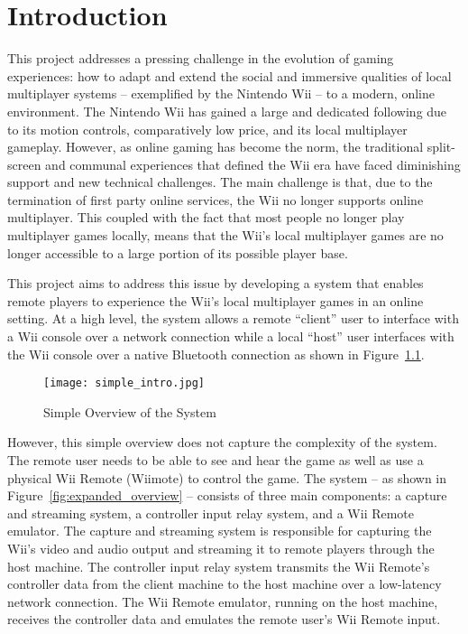 \chapter{Introduction}
\label{chapter:introduction}

This project addresses a pressing challenge in the evolution of gaming experiences: how to adapt and extend the social and immersive qualities of local multiplayer systems -- exemplified by the Nintendo Wii -- to a modern, online environment. The Nintendo Wii has gained a large and dedicated following due to its motion controls, comparatively low price, and its local multiplayer gameplay. However, as online gaming has become the norm\cite{businesswireOnlineGaming}, the traditional split-screen and communal experiences that defined the Wii era have faced diminishing support and new technical challenges. The main challenge is that, due to the termination of first party online services\cite{nintendoTerminationNintendo}, the Wii no longer supports online multiplayer. This coupled with the fact that most people no longer play multiplayer games locally\cite{academyofanimatedartOnlineGaming}, means that the Wii’s local multiplayer games are no longer accessible to a large portion of its possible player base.

This project aims to address this issue by developing a system that enables remote players to experience the Wii’s local multiplayer games in an online setting. At a high level, the system allows a remote ``client'' user to interface with a Wii console over a network connection while a local ``host'' user interfaces with the Wii console over a native Bluetooth connection as shown in Figure~\ref{fig:simple_overview}.

\begin{figure}[h]
	\centering
	\texttt{[image: simple\_intro.jpg]}
	\caption{Simple Overview of the System}
	\label{fig:simple_overview}
\end{figure}

However, this simple overview does not capture the complexity of the system. The remote user needs to be able to see and hear the game as well as use a physical Wii Remote (Wiimote) to control the game. The system -- as shown in Figure~\ref{fig:expanded_overview} -- consists of three main components: a capture and streaming system, a controller input relay system, and a Wii Remote emulator. The capture and streaming system is responsible for capturing the Wii’s video and audio output and streaming it to remote players through the host machine. The controller input relay system transmits the Wii Remote’s controller data from the client machine to the host machine over a low-latency network connection. The Wii Remote emulator, running on the host machine, receives the controller data and emulates the remote user's Wii Remote input.

